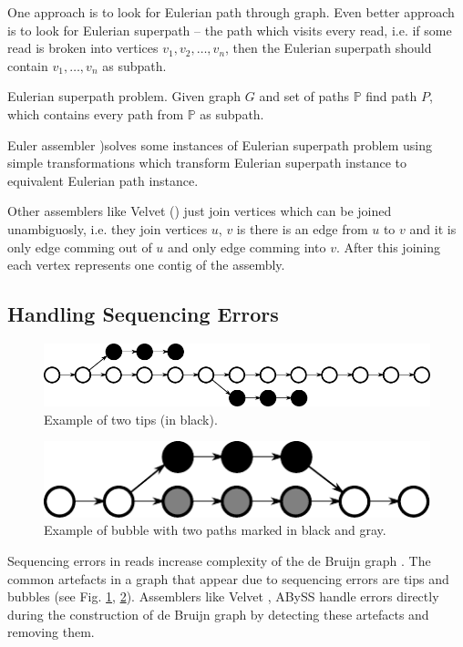 One approach is to look for Eulerian path through graph.
Even better approach is to look for
Eulerian superpath -- the path which visits every read, i.e. if some read
is broken into vertices $v_1, v_2, \dots, v_n$, then the Eulerian superpath
should contain $v_1, \dots, v_n$ as subpath.

\begin{definition}{Eulerian superpath problem.}
Given graph $G$ and set of paths $\mathbb{P}$ find path $P$, which contains
every path from $\mathbb{P}$ as subpath.
\end{definition}

Euler assembler \citep{pevzner2001eulerian})solves some instances of Eulerian superpath problem
using simple transformations which transform Eulerian superpath instance to equivalent Eulerian path instance.

Other assemblers like Velvet (\cite{Velvet}) just join vertices which can be joined
unambiguosly, i.e. they join vertices $u$, $v$ is there is an edge from $u$ to $v$ and
it is only edge comming out of $u$ and only edge comming into $v$. After this joining
each vertex represents one contig of the assembly.

\subsection{Handling Sequencing Errors}

\begin{figure}
  \centerline{\includegraphics[scale=0.9]{../figures/tips.pdf}}
  \caption{Example of two tips (in black).}
  \label{fig:tips}
\end{figure}

\begin{figure}
  \centerline{\includegraphics[scale=0.9]{../figures/bubble.pdf}}
  \caption{Example of bubble with two paths marked in black and gray.}
  \label{fig:bubble}
\end{figure}

Sequencing errors in reads increase complexity of the de Bruijn graph
\citep{pevzner2001eulerian}. The common artefacts in a graph that
appear due to sequencing errors are tips and bubbles
(see Fig. \ref{fig:tips}, \ref{fig:bubble}). Assemblers like Velvet \citep{Velvet}, ABySS \citep{Abyss} handle
errors directly during the construction of de Bruijn graph by detecting these artefacts
and removing them.

